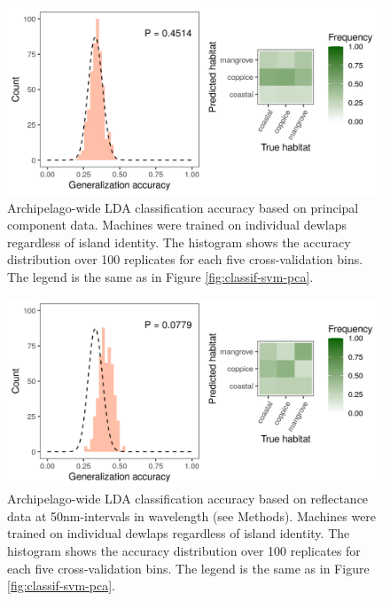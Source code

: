 \begin{figure}[H]
	\centering
	\includegraphics[width=\textwidth]{"../analyses/04-machine learning/plots/classif_lda_pca_pooled"}
	\caption{Archipelago-wide LDA classification accuracy based on principal component data. Machines were trained on individual dewlaps regardless of island identity. The histogram shows the accuracy distribution over 100 replicates for each five cross-validation bins. The legend is the same as in Figure \ref{fig:classif-svm-pca}.}
	\label{supfig:classif-lda-pca-pooled}
\end{figure}

\begin{figure}[H]
	\centering
	\includegraphics[width=\textwidth]{"../analyses/04-machine learning/plots/classif_lda_refl_pooled"}
	\caption{Archipelago-wide LDA classification accuracy based on reflectance data at 50nm-intervals in wavelength (see Methods). Machines were trained on individual dewlaps regardless of island identity. The histogram shows the accuracy distribution over 100 replicates for each five cross-validation bins. The legend is the same as in Figure \ref{fig:classif-svm-pca}.}
	\label{supfig:classif-lda-refl-pooled}
\end{figure}

